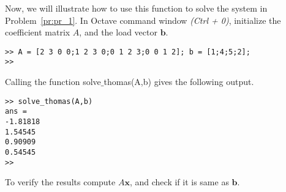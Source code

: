 \documentclass[11pt,a4paper,reqno]{article}
\begin{document}
	
Now, we will illustrate how to use this function to solve the system in Problem~\ref{pr:pr_1}. In Octave command window \emph{(Ctrl + 0)}, initialize the coefficient matrix $A$, and the load vector ${\pmb b}$.

\begin{mdframed}[style=cframe,nobreak=true,align=center]
	\begin{verbatim}
>> A = [2 3 0 0;1 2 3 0;0 1 2 3;0 0 1 2]; b = [1;4;5;2];
>>
	\end{verbatim}
\end{mdframed}

Calling the function solve$\_$thomas(A,b) gives the following output. 

 \begin{mdframed}[style=cframe,nobreak=true,align=center]
 	\begin{verbatim}
>> solve_thomas(A,b)
ans =
-1.81818
1.54545
0.90909
0.54545
>>
\end{verbatim}
 \end{mdframed}
To verify the results compute $A{\pmb x}$, and check if it is same as ${\pmb b}$.
\end{document}
